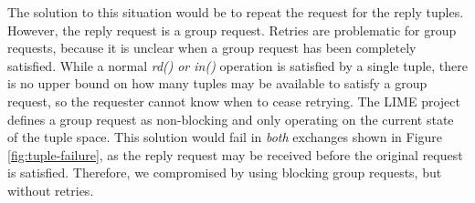 The solution to this situation would be to repeat the request for the reply tuples. However, the reply request is a group request. Retries are problematic for group requests, because it is unclear when a group request has been completely satisfied. While a normal \textit{rd()} \textit{or in()} operation is satisfied by a single tuple, there is no upper bound on how many tuples may be available to satisfy a group request, so the requester cannot know when to cease retrying. The LIME\cite{lime} project defines a group request as non-blocking and only operating on the current state of the tuple space. This solution would fail in \textit{both} exchanges shown in Figure \ref{fig:tuple-failure}, as the reply request may be received before the original request is satisfied. Therefore, we compromised by using blocking group requests, but without retries.

